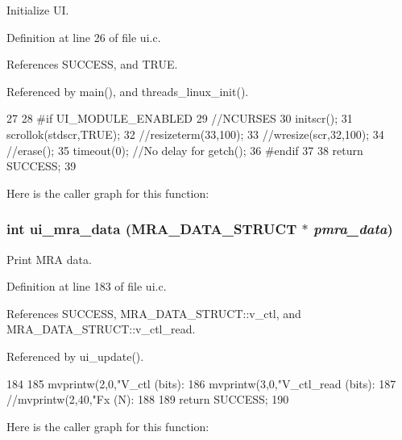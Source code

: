 Initialize UI. 



Definition at line 26 of file ui.c.



References SUCCESS, and TRUE.



Referenced by main(), and threads\_\-linux\_\-init().




\begin{DoxyCode}
27 {
28     #if UI_MODULE_ENABLED
29         //NCURSES
30         initscr();
31         scrollok(stdscr,TRUE);
32         //resizeterm(33,100);
33         //wresize(scr,32,100);
34         //erase();
35         timeout(0); //No delay for getch();
36     #endif
37 
38         return SUCCESS;
39 }
\end{DoxyCode}




Here is the caller graph for this function:

\hypertarget{group__ui_gaefec243c5df45db0350c1abbccf20e3b}{
\subsubsection[{ui\_\-mra\_\-data}]{\setlength{\rightskip}{0pt plus 5cm}int ui\_\-mra\_\-data ({\bf MRA\_\-DATA\_\-STRUCT} $\ast$ {\em pmra\_\-data})}}
\label{group__ui_gaefec243c5df45db0350c1abbccf20e3b}


Print MRA data. 



Definition at line 183 of file ui.c.



References SUCCESS, MRA\_\-DATA\_\-STRUCT::v\_\-ctl, and MRA\_\-DATA\_\-STRUCT::v\_\-ctl\_\-read.



Referenced by ui\_\-update().




\begin{DoxyCode}
184 {
185         mvprintw(2,0,"V_ctl (bits): %
186         mvprintw(3,0,"V_ctl_read (bits): %
187         //mvprintw(2,40,"Fx (N): %
188 
189         return SUCCESS;
190 }
\end{DoxyCode}




Here is the caller graph for this function:

